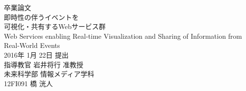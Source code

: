 \thispagestyle{empty}
\begin{center}
\vspace*{-1cm}
\Huge{卒業論文}\\
\vspace{1cm}
\LARGE{即時性の伴うイベントを\\可視化・共有するWebサービス群}\\
\vspace{0.2cm}
\large{Web Services enabling Real-time Visualization and Sharing of Information from Real-World Events}\\
\vspace{2cm}
\Large{2016年 1月 22日 提出}\\
\vspace{2cm}
\LARGE{指導教官 岩井将行 准教授}\\
\vspace{1cm}
\LARGE{未来科学部 情報メディア学科}\\
\vspace{1cm}
\huge{12FI091 橋 洸人}\\
\end{center}
